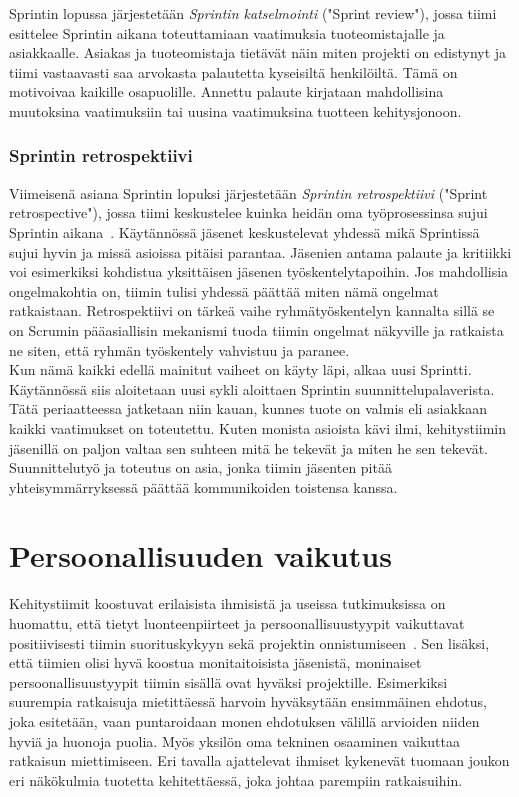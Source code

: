 \documentclass[finnish]{../tktltiki2}
\theoremstyle{definition}
\theoremstyle{remark}
\begin{document}
Sprintin lopussa järjestetään \emph{Sprintin katselmointi} ("Sprint review"), jossa tiimi esittelee Sprintin aikana toteuttamiaan
vaatimuksia tuoteomistajalle ja asiakkaalle. Asiakas ja tuoteomistaja
tietävät näin miten projekti on edistynyt ja tiimi vastaavasti saa
arvokasta palautetta kyseisiltä henkilöiltä. Tämä on motivoivaa
kaikille osapuolille. Annettu palaute kirjataan mahdollisina muutoksina
vaatimuksiin tai uusina vaatimuksina tuotteen kehitysjonoon.

\subsubsection{Sprintin retrospektiivi}

Viimeisenä asiana Sprintin lopuksi järjestetään \emph{Sprintin retrospektiivi}
("Sprint retrospective"), jossa tiimi keskustelee kuinka heidän
oma työprosessinsa sujui Sprintin aikana~\cite{Scrumprimer}. Käytännössä jäsenet
keskustelevat yhdessä mikä Sprintissä sujui hyvin ja missä
asioissa pitäisi parantaa. Jäsenien antama palaute ja kritiikki
voi esimerkiksi kohdistua yksittäisen jäsenen työskentelytapoihin.
Jos mahdollisia ongelmakohtia on, tiimin tulisi yhdessä päättää
miten nämä ongelmat ratkaistaan. Retrospektiivi on tärkeä vaihe
ryhmätyöskentelyn kannalta sillä se on Scrumin pääasiallisin
mekanismi tuoda tiimin ongelmat näkyville ja ratkaista ne siten,
että ryhmän työskentely vahvistuu ja paranee.\\

Kun nämä kaikki edellä mainitut vaiheet on käyty läpi, alkaa uusi
Sprintti. Käytännössä siis aloitetaan uusi sykli aloittaen
Sprintin suunnittelupalaverista. Tätä periaatteessa jatketaan
niin kauan, kunnes tuote on valmis eli asiakkaan kaikki vaatimukset
on toteutettu. Kuten monista asioista kävi ilmi, kehitystiimin jäsenillä on paljon valtaa sen suhteen mitä he tekevät ja miten he
sen tekevät. Suunnittelutyö ja toteutus on asia, jonka tiimin
jäsenten pitää yhteisymmärryksessä päättää kommunikoiden toistensa kanssa.

\section{Persoonallisuuden vaikutus}

Kehitystiimit koostuvat erilaisista ihmisistä ja useissa tutkimuksissa on huomattu, että tietyt
luonteenpiirteet ja persoonallisuustyypit vaikuttavat positiivisesti tiimin suorituskykyyn sekä
projektin onnistumiseen~\cite{Acuna:2008:ESP:1414004.1414056,Gorla:2004:WWB:990680.990684,Capretz:2003:PTS:766407.766410,Capretz:2010:MSS:1726559.1726574}. Sen lisäksi, että tiimien olisi hyvä koostua monitaitoisista
jäsenistä, moninaiset persoonallisuustyypit tiimin sisällä ovat hyväksi
projektille. Esimerkiksi suurempia ratkaisuja mietittäessä harvoin hyväksytään
ensimmäinen ehdotus, joka esitetään, vaan puntaroidaan monen ehdotuksen
välillä arvioiden niiden hyviä ja huonoja puolia. Myös yksilön oma
tekninen osaaminen vaikuttaa ratkaisun miettimiseen. Eri tavalla ajattelevat ihmiset kykenevät tuomaan joukon
eri näkökulmia tuotetta kehitettäessä, joka johtaa parempiin ratkaisuihin.\\
\end{document}
